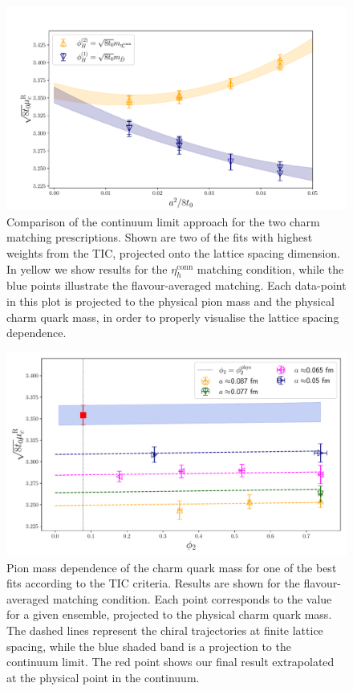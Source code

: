 \begin{figure}[!htb]
	\centering 
	\includegraphics[scale=0.6]{./cap6/figs/mc/mc_cl_all_cat.pdf}
	\caption{Comparison of the continuum limit approach for the two  charm matching 
	prescriptions. Shown are two of the fits with highest weights from the TIC, projected onto the lattice 
	spacing dimension. In yellow we show results for the $\eta_h^{\mathrm{conn}}$ matching condition, while  the blue 
	points illustrate  the flavour-averaged matching. Each data-point in this plot is projected to the 
	physical pion mass and the physical charm quark mass, in order to properly visualise the lattice 
	spacing dependence. }
	\label{fig:mc_continuum_limit}
\end{figure}

\begin{figure}
	\centering
	\includegraphics[scale=0.52]{./cap6/figs/mc/fit_phi2_muc_fl_ave.pdf}
	\caption{Pion mass dependence of the charm quark mass for one of the best  fits according to the TIC criteria. Results are shown for the flavour-averaged matching condition. Each point corresponds to the  value for a given ensemble, projected to the physical charm quark mass. The dashed lines represent the chiral trajectories at finite lattice spacing, while the blue shaded band is a projection to the continuum limit. The red point shows our final result extrapolated at the physical point in the continuum. }
	\label{fig:mc_pion_dependence}
\end{figure}


